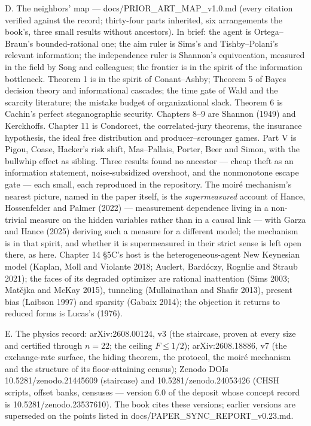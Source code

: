 \begin{receipts}{}
D. The neighbors' map --- docs/\allowbreak{}PRIOR\_\allowbreak{}ART\_\allowbreak{}MAP\_\allowbreak{}v1.\allowbreak{}0.\allowbreak{}md (every citation verified against the record; thirty-four parts inherited, six arrangements the book's, three small results without ancestors). In brief: the agent is Ortega--Braun's bounded-rational one; the aim ruler is Sims's and Tishby--Polani's relevant information; the independence ruler is Shannon's equivocation, measured in the field by Song and colleagues; the frontier is in the spirit of the information bottleneck. Theorem 1 is in the spirit of Conant--Ashby; Theorem 5 of Bayes decision theory and informational cascades; the time gate of Wald and the scarcity literature; the mistake budget of organizational slack. Theorem 6 is Cachin's perfect steganographic security. Chapters 8--9 are Shannon (1949) and Kerckhoffs. Chapter 11 is Condorcet, the correlated-jury theorems, the insurance hypothesis, the ideal free distribution and producer--scrounger games. Part V is Pigou, Coase, Hacker's risk shift, Mas--Pallais, Porter, Beer and Simon, with the bullwhip effect as sibling. Three results found no ancestor --- cheap theft as an information statement, noise-subsidized overshoot, and the nonmonotone escape gate --- each small, each reproduced in the repository. The moiré mechanism's nearest picture, named in the paper itself, is the \emph{supermeasured} account of Hance, Hossenfelder and Palmer (2022) --- measurement dependence living in a non-trivial measure on the hidden variables rather than in a causal link --- with Garza and Hance (2025) deriving such a measure for a different model; the mechanism is in that spirit, and whether it is supermeasured in their strict sense is left open there, as here. Chapter 14 §5C's host is the heterogeneous-agent New Keynesian model (Kaplan, Moll and Violante 2018; Auclert, Bardóczy, Rognlie and Straub 2021); the faces of its degraded optimizer are rational inattention (Sims 2003; Matějka and McKay 2015), tunneling (Mullainathan and Shafir 2013), present bias (Laibson 1997) and sparsity (Gabaix 2014); the objection it returns to reduced forms is Lucas's (1976).

E. The physics record: arXiv:2608.00124, v3 (the staircase, proven at every size and certified through \(n = 22\); the ceiling \(F \le 1/2\)); arXiv:2608.18886, v7 (the exchange-rate surface, the hiding theorem, the protocol, the moiré mechanism and the structure of its floor-attaining census); Zenodo DOIs 10.\allowbreak{}5281/\allowbreak{}zenodo.\allowbreak{}21445609 (staircase) and 10.\allowbreak{}5281/\allowbreak{}zenodo.\allowbreak{}24053426 (CHSH scripts, offset banks, censuses --- version 6.0 of the deposit whose concept record is 10.\allowbreak{}5281/\allowbreak{}zenodo.\allowbreak{}23537610). The book cites these versions; earlier versions are superseded on the points listed in docs/\allowbreak{}PAPER\_\allowbreak{}SYNC\_\allowbreak{}REPORT\_\allowbreak{}v0.\allowbreak{}23.\allowbreak{}md.


\end{receipts}
